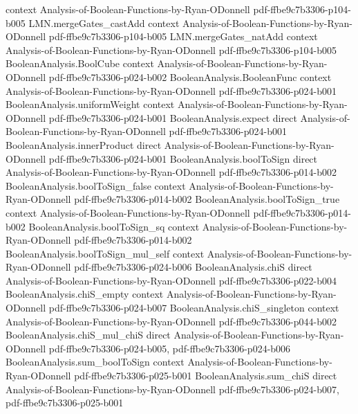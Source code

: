 \begin{lemma}
  {context}
  {Analysis-of-Boolean-Functions-by-Ryan-ODonnell}
  {pdf-ffbe9c7b3306-p104-b005}
\proofstep
  {LMN.mergeGates_castAdd}
  {context}
  {Analysis-of-Boolean-Functions-by-Ryan-ODonnell}
  {pdf-ffbe9c7b3306-p104-b005}
\proofstep
  {LMN.mergeGates_natAdd}
  {context}
  {Analysis-of-Boolean-Functions-by-Ryan-ODonnell}
  {pdf-ffbe9c7b3306-p104-b005}
\proofstep
  {BooleanAnalysis.BoolCube}
  {context}
  {Analysis-of-Boolean-Functions-by-Ryan-ODonnell}
  {pdf-ffbe9c7b3306-p024-b002}
\proofstep
  {BooleanAnalysis.BooleanFunc}
  {context}
  {Analysis-of-Boolean-Functions-by-Ryan-ODonnell}
  {pdf-ffbe9c7b3306-p024-b001}
\proofstep
  {BooleanAnalysis.uniformWeight}
  {context}
  {Analysis-of-Boolean-Functions-by-Ryan-ODonnell}
  {pdf-ffbe9c7b3306-p024-b001}
\proofstep
  {BooleanAnalysis.expect}
  {direct}
  {Analysis-of-Boolean-Functions-by-Ryan-ODonnell}
  {pdf-ffbe9c7b3306-p024-b001}
\proofstep
  {BooleanAnalysis.innerProduct}
  {direct}
  {Analysis-of-Boolean-Functions-by-Ryan-ODonnell}
  {pdf-ffbe9c7b3306-p024-b001}
\proofstep
  {BooleanAnalysis.boolToSign}
  {direct}
  {Analysis-of-Boolean-Functions-by-Ryan-ODonnell}
  {pdf-ffbe9c7b3306-p014-b002}
\proofstep
  {BooleanAnalysis.boolToSign_false}
  {context}
  {Analysis-of-Boolean-Functions-by-Ryan-ODonnell}
  {pdf-ffbe9c7b3306-p014-b002}
\proofstep
  {BooleanAnalysis.boolToSign_true}
  {context}
  {Analysis-of-Boolean-Functions-by-Ryan-ODonnell}
  {pdf-ffbe9c7b3306-p014-b002}
\proofstep
  {BooleanAnalysis.boolToSign_sq}
  {context}
  {Analysis-of-Boolean-Functions-by-Ryan-ODonnell}
  {pdf-ffbe9c7b3306-p014-b002}
\proofstep
  {BooleanAnalysis.boolToSign_mul_self}
  {context}
  {Analysis-of-Boolean-Functions-by-Ryan-ODonnell}
  {pdf-ffbe9c7b3306-p024-b006}
\proofstep
  {BooleanAnalysis.chiS}
  {direct}
  {Analysis-of-Boolean-Functions-by-Ryan-ODonnell}
  {pdf-ffbe9c7b3306-p022-b004}
\proofstep
  {BooleanAnalysis.chiS_empty}
  {context}
  {Analysis-of-Boolean-Functions-by-Ryan-ODonnell}
  {pdf-ffbe9c7b3306-p024-b007}
\proofstep
  {BooleanAnalysis.chiS_singleton}
  {context}
  {Analysis-of-Boolean-Functions-by-Ryan-ODonnell}
  {pdf-ffbe9c7b3306-p044-b002}
\proofstep
  {BooleanAnalysis.chiS_mul_chiS}
  {direct}
  {Analysis-of-Boolean-Functions-by-Ryan-ODonnell}
  {pdf-ffbe9c7b3306-p024-b005,
    pdf-ffbe9c7b3306-p024-b006}
\proofstep
  {BooleanAnalysis.sum_boolToSign}
  {context}
  {Analysis-of-Boolean-Functions-by-Ryan-ODonnell}
  {pdf-ffbe9c7b3306-p025-b001}
\proofstep
  {BooleanAnalysis.sum_chiS}
  {direct}
  {Analysis-of-Boolean-Functions-by-Ryan-ODonnell}
  {pdf-ffbe9c7b3306-p024-b007,
    pdf-ffbe9c7b3306-p025-b001}

\end{lemma}

